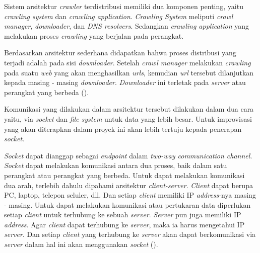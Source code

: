 Sistem arsitektur \emph{crawler} terdistribusi memiliki dua komponen penting, yaitu \emph{crawling system} dan \emph{crawling application}. \emph{Crawling System} meliputi \emph{crawl manager}, \emph{downloader}, dan \emph{DNS resolvers}. Sedangkan \emph{crawling application} yang melakukan proses \emph{crawling} yang berjalan pada perangkat.


Berdasarkan arsitektur sederhana didapatkan bahwa proses distribusi yang terjadi adalah pada sisi \emph{downloader}. Setelah \emph{crawl manager} melakukan \emph{crawling} pada suatu \emph{web} yang akan menghasilkan \emph{urls}, kemudian \emph{url} tersebut dilanjutkan kepada masing - masing \emph{downloader}. \emph{Downloader} ini terletak pada \emph{server} atau perangkat yang berbeda (\cite{shkapenyuk2002distributed}).

Komunikasi yang dilakukan dalam arsitektur tersebut dilakukan dalam dua cara yaitu, via \emph{socket} dan \emph{file system} untuk data yang lebih besar. Untuk improvisasi yang akan diterapkan dalam proyek ini akan lebih tertuju kepada penerapan \emph{socket}.

\emph{Socket} dapat dianggap sebagai \emph{endpoint} dalam \emph{two-way communication channel}. \emph{Socket} dapat melakukan komunikasi antara dua proses, baik dalam satu perangkat atau perangkat yang berbeda. Untuk dapat melakukan komunikasi dua arah, terlebih dahulu dipahami arsitektur \emph{client-server}. \emph{Client} dapat berupa PC, laptop, telepon seluler, dll. Dan setiap \emph{client} memiliki IP \emph{address}-nya masing - masing. Untuk dapat melakukan komunikasi atau pertukaran data diperlukan setiap \emph{client} untuk terhubung ke sebuah \emph{server}. \emph{Server} pun juga memiliki IP \emph{address}. Agar \emph{client} dapat terhubung ke \emph{server}, maka ia harus mengetahui IP \emph{server}. Dan setiap \emph{client} yang terhubung ke \emph{server} akan dapat berkomunikasi via \emph{server} dalam hal ini akan menggunakan \emph{socket} (\cite{ibm2021whatissocket}).


